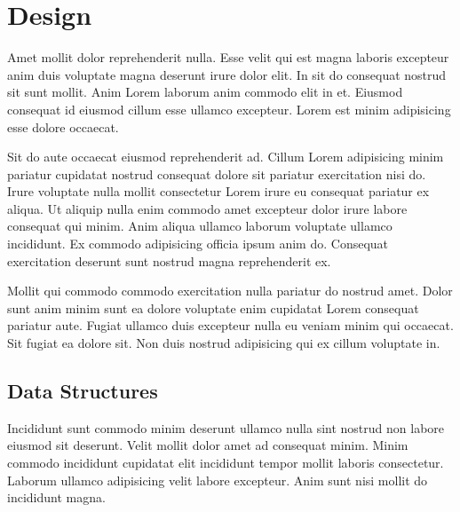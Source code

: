 \lstset{language=bash}
\newpage
\chapter{Design} %




Amet mollit dolor reprehenderit nulla. Esse velit qui est magna laboris excepteur anim duis voluptate magna deserunt irure dolor elit. In sit do consequat nostrud sit sunt mollit. Anim Lorem laborum anim commodo elit in et. Eiusmod consequat id eiusmod cillum esse ullamco excepteur. Lorem est minim adipisicing esse dolore occaecat.

Sit do aute occaecat eiusmod reprehenderit ad. Cillum Lorem adipisicing minim pariatur cupidatat nostrud consequat dolore sit pariatur exercitation nisi do. Irure voluptate nulla mollit consectetur Lorem irure eu consequat pariatur ex aliqua. Ut aliquip nulla enim commodo amet excepteur dolor irure labore consequat qui minim. Anim aliqua ullamco laborum voluptate ullamco incididunt. Ex commodo adipisicing officia ipsum anim do. Consequat exercitation deserunt sunt nostrud magna reprehenderit ex.

Mollit qui commodo commodo exercitation nulla pariatur do nostrud amet. Dolor sunt anim minim sunt ea dolore voluptate enim cupidatat Lorem consequat pariatur aute. Fugiat ullamco duis excepteur nulla eu veniam minim qui occaecat. Sit fugiat ea dolore sit. Non duis nostrud adipisicing qui ex cillum voluptate in.


\section{Data Structures}

Incididunt sunt commodo minim deserunt ullamco nulla sint nostrud non labore eiusmod sit deserunt. Velit mollit dolor amet ad consequat minim. Minim commodo incididunt cupidatat elit incididunt tempor mollit laboris consectetur. Laborum ullamco adipisicing velit labore excepteur. Anim sunt nisi mollit do incididunt magna.

